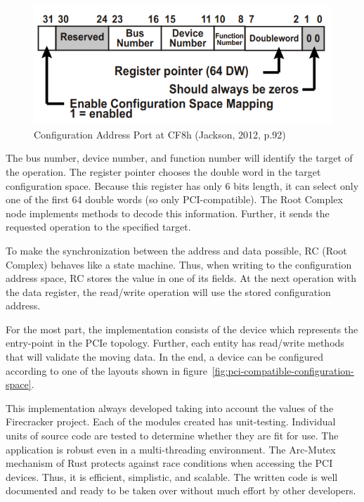 \documentclass[12pt, a4paper]{report}
\begin{document}
\begin{figure}[H]
\centering
\includegraphics[width=\textwidth, keepaspectratio]{pics/configuration-CF8h.png}
  \caption{{Configuration Address Port at CF8h (Jackson, 2012, p.92)}\cite{book_pci_express}}
  \label{fig:configuration-CF8h}
\end{figure}

The bus number, device number, and function number will identify the target of the operation. The register pointer chooses the double word in the target configuration space. Because this register has only 6 bits length, it can select only one of the first 64 double words (so only PCI-compatible). The Root Complex node implements methods to decode this information. Further, it sends the requested operation to the specified target.

To make the synchronization between the address and data possible, RC (Root Complex) behaves like a state machine. Thus, when writing to the configuration address space, RC stores the value in one of its fields. At the next operation with the data register, the read/write operation will use the stored configuration address.

For the most part, the implementation consists of the device which represents the entry-point in the PCIe topology. Further, each entity has read/write methods that will validate the moving data. In the end, a device can be configured according to one of the layouts shown in figure~\ref{fig:pci-compatible-configuration-space}.

This implementation always developed taking into account the values of the Firecracker project. Each of the modules created has unit-testing. Individual units of source code are tested to determine whether they are fit for use. The application is robust even in a multi-threading environment. The Arc-Mutex mechanism of Rust protects against race conditions when accessing the PCI devices.  Thus, it is efficient, simplistic, and scalable. The written code is well documented and ready to be taken over without much effort by other developers.
\end{document}
